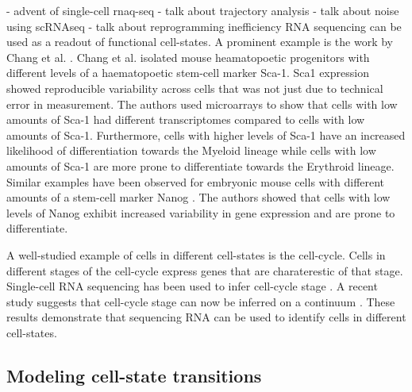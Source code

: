 - advent of single-cell rnaq-seq
- talk about trajectory analysis
- talk about noise using scRNAseq
- talk about reprogramming inefficiency
RNA sequencing can be used as a readout of functional cell-states. A prominent example is the work by Chang et al.  \cite{chang_transcriptome-wide_2008}. Chang et al. isolated mouse heamatopoetic progenitors with different levels of a haematopoetic stem-cell marker Sca-1.  Sca1 expression showed reproducible variability across cells that was not just due to technical error in measurement. The authors used microarrays to show that cells with low amounts of Sca-1 had different transcriptomes compared to cells with low amounts of Sca-1. Furthermore, cells with higher levels of Sca-1 have an increased likelihood of differentiation towards the Myeloid lineage while cells with low amounts of Sca-1 are more prone to differentiate towards the Erythroid lineage. Similar examples have been observed for embryonic mouse cells with different amounts of a stem-cell marker Nanog \cite{kalmar_regulated_2009}. The authors showed that cells with low levels of Nanog exhibit increased variability in gene expression and are prone to differentiate.

A well-studied example of cells in different cell-states is the cell-cycle. Cells in different stages of the cell-cycle express genes that are charaterestic of that stage. Single-cell RNA sequencing has been used to infer cell-cycle stage \cite{buettner_computational_2015,leng_oscope_2015}. A recent study suggests that cell-cycle stage can now be inferred on a continuum  \cite{hsiao_characterizing_2019}. These results demonstrate that sequencing RNA can be used to identify cells in different cell-states.  \cite{trapnell_defining_2015,shaffer_memory_2018,sharma_chromatin-mediated_2010}

\subsection{Modeling cell-state transitions}

